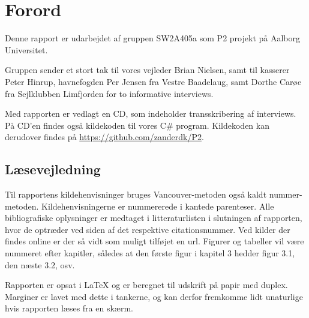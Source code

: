 \chapter*{Forord}
Denne rapport er udarbejdet af gruppen SW2A405a som P2 projekt på Aalborg Universitet.

Gruppen sender et stort tak til vores vejleder Brian Nielsen, samt til kasserer Peter Hinrup, havnefogden Per Jensen fra Vestre Baadelaug, samt Dorthe Carøe fra Sejlklubben Limfjorden for to informative interviews.

Med rapporten er vedlagt en CD, som indeholder transskribering af interviews. På CD'en findes også kildekoden til vores C\# program. Kildekoden kan derudover findes på \url{https://github.com/zanderdk/P2}.

\section*{Læsevejledning}
Til rapportens kildehenvisninger bruges Vancouver-metoden også kaldt nummer-metoden. Kildehenvisningerne er nummererede i kantede parenteser. Alle bibliografiske oplysninger er medtaget i litteraturlisten i slutningen af rapporten, hvor de optræder ved siden af det respektive citationsnummer. Ved kilder der findes online er der så vidt som muligt tilføjet en url. Figurer og tabeller vil være nummeret efter kapitler, således at den første figur i kapitel 3 hedder figur 3.1, den næste 3.2, osv.	

Rapporten er opsat i \LaTeX{} og er beregnet til udskrift på papir med duplex. Marginer er lavet med dette i tankerne, og kan derfor fremkomme lidt unaturlige hvis rapporten læses fra en skærm.
